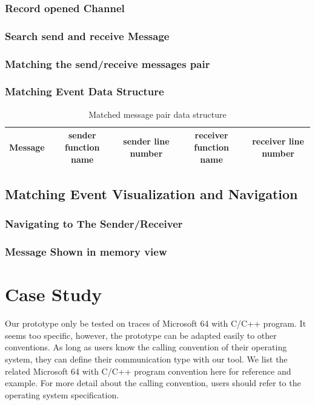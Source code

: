 \documentclass[paper=a4, fontsize=11pt]{scrartcl}
\numberwithin{equation}{section}		%
\numberwithin{figure}{section}			%
\numberwithin{table}{section}				%
\begin{document}
\subsubsection{Record opened Channel}

\subsubsection{Search send and receive Message}
\subsubsection{Matching the send/receive messages pair}
\subsubsection{Matching Event Data Structure}
\begin{table}[h]
 \begin{center}
  \caption{Matched message pair data structure}
\label{table2}
\begin{tabular}{|c|c|c|c|c|}
      \hline
         Message& sender function name & sender line number  & receiver function name & receiver line number \\
       \hline
\end{tabular}
\end{center}
\end{table}
\subsection{Matching Event Visualization and Navigation}
\subsubsection{Navigating to The Sender/Receiver}
\subsubsection{Message Shown in memory view}


\section{Case Study}
Our prototype only be tested on traces of Microsoft 64 with C/C++ program. It seems too specific, however, the prototype can be adapted easily to other conventions. As long as users know the calling convention of their operating system, they can define their communication type with our tool. We list the related Microsoft 64 with C/C++ program convention here for reference and example. For more detail about the calling convention, users should refer to the operating system specification.\par
\end{document}
